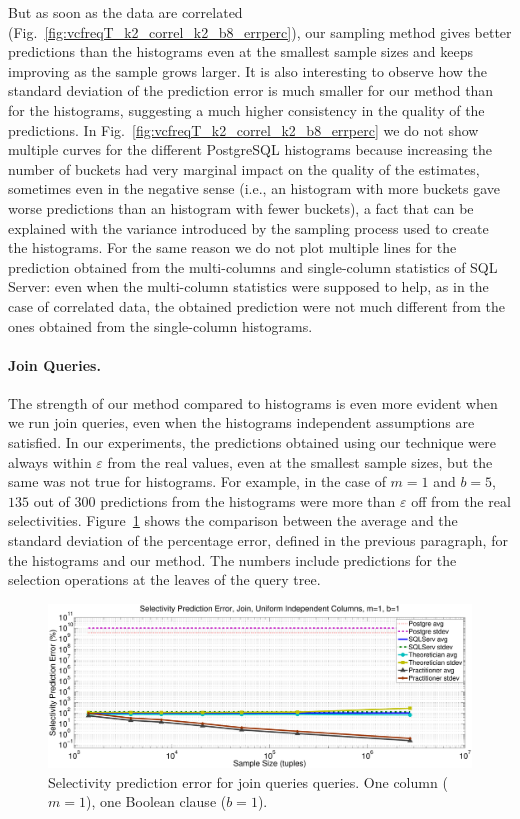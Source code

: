 But as soon as the data are
correlated (Fig.~\ref{fig:vcfreqT_k2_correl_k2_b8_errperc}), our sampling method gives better
predictions than the histograms even at the smallest sample sizes and keeps
improving as the sample grows larger. It is also interesting to observe how the
standard deviation of the prediction error is much smaller for our method than
for the histograms, suggesting a much higher consistency in the quality of the
predictions. In Fig.~\ref{fig:vcfreqT_k2_correl_k2_b8_errperc} we do not show multiple
curves for the different PostgreSQL histograms because increasing the number of
buckets had very marginal impact on the quality of the estimates, sometimes even
in the negative sense (i.e., an histogram with more buckets gave worse
predictions than an histogram with fewer buckets), a fact that can be explained
with the variance introduced by the sampling process used to create the
histograms. For the same reason we do not plot multiple lines for the
prediction obtained from the multi-columns and single-column statistics of SQL
Server: even when the multi-column statistics were supposed to help, as in the
case of correlated data, the obtained prediction were not much different from
the ones obtained from the single-column histograms.

\paragraph{Join Queries.} The strength of our method compared to histograms is
even more evident when we run join queries, even when the histograms independent assumptions are
satisfied. In our experiments, the predictions obtained using our technique were
always within $\varepsilon$ from the real values, even at the smallest sample
sizes, but the same was not true for histograms. For example, in the case of
$m=1$ and $b=5$, $135$ out of $300$ predictions from the histograms were more
than $\varepsilon$ off from the real selectivities.
Figure~\ref{fig:vcfreqjoin_k1_b1_errperc} shows the comparison between the average and
the standard deviation of the percentage error, defined in the previous
paragraph, for the histograms and our method. The numbers include predictions
for the selection operations at the leaves of the query tree.

\begin{figure}[tp]
  \centering
  \includegraphics[scale=0.3]{vcfreq/join_k1_b1_errperc}
  \caption{Selectivity prediction error for join queries queries. One column
  ($m=1$), one Boolean clause ($b=1$).}
  \label{fig:vcfreqjoin_k1_b1_errperc}
\end{figure}

